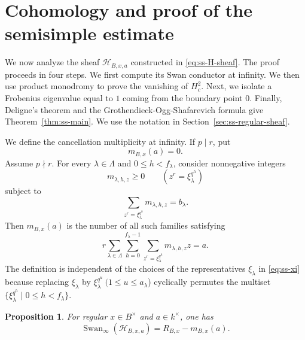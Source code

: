 \documentclass[11pt]{amsart}
\newtheorem{proposition}[theorem]{Proposition}
\theoremstyle{remark}
\newcommand{\Swan}{\operatorname{Swan}}
\newcommand{\cH}{\mathcal H}
\begin{document}
\section{Cohomology and proof of the semisimple estimate}
\label{sec:ss-cohomology-proof}

We now analyze the sheaf $\cH_{B,x,a}$ constructed in
\eqref{eq:ss-H-sheaf}. The proof proceeds in four steps. We first compute its Swan conductor at infinity. We then use product monodromy to prove the
vanishing of $H_c^2$. Next, we isolate a Frobenius eigenvalue equal to $1$ coming from the boundary point $0$. Finally, Deligne's theorem and the
Grothendieck-Ogg-Shafarevich formula give Theorem~\ref{thm:ss-main}. We use the notation in Section~\ref{sec:ss-regular-sheaf}.

We define the cancellation multiplicity at infinity. If $p\mid r$, put
\begin{equation}\label{eq:ss-m-p-divides-r}
 m_{B,x}(a)=0.
\end{equation}
Assume $p\nmid r$. For every $\lambda\in\Lambda$ and
$0\leq h<f_{\lambda}$, consider nonnegative integers
\begin{equation}\label{eq:ss-m-family}
m_{\lambda,h,z}\ge 0\qquad (z^r=\xi_{\lambda}^{q^h})
\end{equation}
subject to
\begin{equation}\label{eq:ss-weak-composition}
\sum_{z^r=\xi_{\lambda}^{q^h}}m_{\lambda,h,z}=b_{\lambda}.
\end{equation}
Then $m_{B,x}(a)$ is the number of all such families satisfying
\begin{equation}\label{eq:ss-cancellation}
r\sum_{\lambda\in\Lambda}\sum_{h=0}^{f_{\lambda}-1}
 \sum_{z^r=\xi_{\lambda}^{q^h}}m_{\lambda,h,z}z=a.
\end{equation}
The definition is independent of the choices of the representatives $\xi_{\lambda}$ in \eqref{eq:ss-xi} because replacing $\xi_{\lambda}$ by $\xi_{\lambda}^{q^u} ~(1\le u\le a_{\lambda}$) cyclically permutes the multiset $\{\xi_{\lambda}^{q^h}\mid0\le h<f_{\lambda}\}$.

\begin{proposition}\label{prop:ss-swan}
For regular $x\in B^{\times}$ and $a\in k^{\times}$, one has
\begin{equation}\label{eq:ss-swan-formula}
\Swan_\infty(\cH_{B,x,a})=R_{B,x}-m_{B,x}(a).
\end{equation}
\end{proposition}
\end{document}
